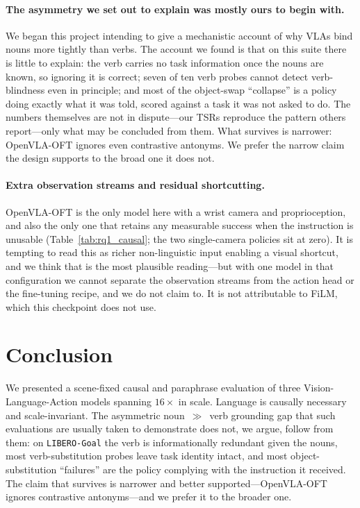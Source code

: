 \documentclass[11pt]{article}
\begin{document}
\paragraph{The asymmetry we set out to explain was mostly ours to begin with.} We
began this project intending to give a mechanistic account of why VLAs bind nouns
more tightly than verbs. The account we found is that on this suite there is little
to explain: the verb carries no task information once the nouns are known, so
ignoring it is correct; seven of ten verb probes cannot detect verb-blindness even in
principle; and most of the object-swap ``collapse'' is a policy doing exactly what it
was told, scored against a task it was not asked to do. The numbers themselves are
not in dispute---our TSRs reproduce the pattern others report---only what may be
concluded from them. What survives is narrower: OpenVLA-OFT ignores even contrastive
antonyms. We prefer the narrow claim the design supports to the broad one it does not.

\paragraph{Extra observation streams and residual shortcutting.} OpenVLA-OFT is the
only model here with a wrist camera and proprioception, and also the only one that
retains any measurable success when the instruction is unusable
(Table~\ref{tab:rq1_causal}; the two single-camera policies sit at zero). It is
tempting to read this as richer non-linguistic input enabling a visual shortcut, and
we think that is the most plausible reading---but with one model in that
configuration we cannot separate the observation streams from the action head or the
fine-tuning recipe, and we do not claim to. It is not attributable to FiLM, which
this checkpoint does not use.

\section{Conclusion}
We presented a scene-fixed causal and paraphrase evaluation of three
Vision-Language-Action models spanning $16\times$ in scale. Language is causally
necessary and scale-invariant. The asymmetric noun~$\gg$~verb grounding gap that
such evaluations are usually taken to demonstrate does not, we argue, follow from
them: on \texttt{LIBERO-Goal} the verb is informationally redundant given the
nouns, most verb-substitution probes leave task identity intact, and most
object-substitution ``failures'' are the policy complying with the instruction it
received. The claim that survives is narrower and better supported---OpenVLA-OFT
ignores contrastive antonyms---and we prefer it to the broader one.
\end{document}
